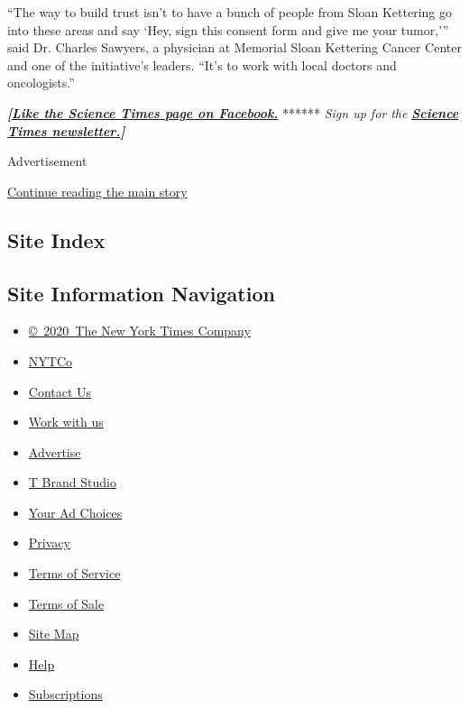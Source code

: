 ``The way to build trust isn't to have a bunch of people from Sloan
Kettering go into these areas and say `Hey, sign this consent form and
give me your tumor,''' said Dr. Charles Sawyers, a physician at Memorial
Sloan Kettering Cancer Center and one of the initiative's leaders.
``It's to work with local doctors and oncologists.''

\textbf{\emph{{[}}\href{http://on.fb.me/1paTQ1h}{\emph{Like the Science
Times page on Facebook.}}} ****** \emph{\textbar{} Sign up for the}
\textbf{\href{http://nyti.ms/1MbHaRU}{\emph{Science Times
newsletter.}}\emph{{]}}}

Advertisement

\protect\hyperlink{after-bottom}{Continue reading the main story}

\hypertarget{site-index}{%
\subsection{Site Index}\label{site-index}}

\hypertarget{site-information-navigation}{%
\subsection{Site Information
Navigation}\label{site-information-navigation}}

\begin{itemize}
\tightlist
\item
  \href{https://help.nytimes3xbfgragh.onion/hc/en-us/articles/115014792127-Copyright-notice}{©~2020~The
  New York Times Company}
\end{itemize}

\begin{itemize}
\tightlist
\item
  \href{https://www.nytco.com/}{NYTCo}
\item
  \href{https://help.nytimes3xbfgragh.onion/hc/en-us/articles/115015385887-Contact-Us}{Contact
  Us}
\item
  \href{https://www.nytco.com/careers/}{Work with us}
\item
  \href{https://nytmediakit.com/}{Advertise}
\item
  \href{http://www.tbrandstudio.com/}{T Brand Studio}
\item
  \href{https://www.nytimes3xbfgragh.onion/privacy/cookie-policy\#how-do-i-manage-trackers}{Your
  Ad Choices}
\item
  \href{https://www.nytimes3xbfgragh.onion/privacy}{Privacy}
\item
  \href{https://help.nytimes3xbfgragh.onion/hc/en-us/articles/115014893428-Terms-of-service}{Terms
  of Service}
\item
  \href{https://help.nytimes3xbfgragh.onion/hc/en-us/articles/115014893968-Terms-of-sale}{Terms
  of Sale}
\item
  \href{https://spiderbites.nytimes3xbfgragh.onion}{Site Map}
\item
  \href{https://help.nytimes3xbfgragh.onion/hc/en-us}{Help}
\item
  \href{https://www.nytimes3xbfgragh.onion/subscription?campaignId=37WXW}{Subscriptions}
\end{itemize}
